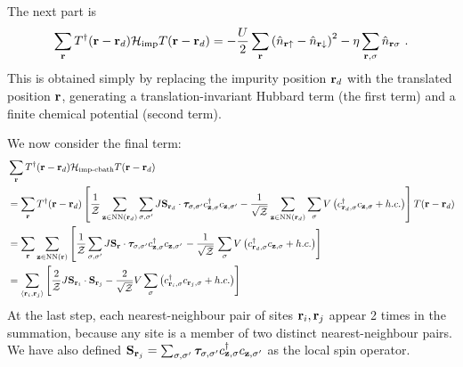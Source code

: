 \documentclass[reprint,hidelinks,onecolumn]{revtex4-2}
\begin{document}
The next part is
\begin{equation}\begin{aligned}
	\sum_{{\bf r}}T^\dagger({\bf r} - {\bf r}_d)\mathcal{H}_\text{imp}T({\bf r} - {\bf r}_d) = -\frac{U}{2}\sum_{{\bf r}}\left(\hat n_{{\bf r} \uparrow} - \hat n_{{\bf r} \downarrow} \right)^2 - \eta\sum_{{\bf r},\sigma} \hat n_{{\bf r}\sigma}~.
\end{aligned}\end{equation}
This is obtained simply by replacing the impurity position \({\bf r}_d\) with the translated position \({\bf r}\), generating a translation-invariant Hubbard term (the first term) and a finite chemical potential (second term).

We now consider the final term:
\begin{equation}\begin{aligned}
	&\sum_{{\bf r}}T^\dagger({\bf r} - {\bf r}_d)\mathcal{H}_\text{imp-cbath}T({\bf r} - {\bf r}_d)\\
	&=\sum_{{\bf r}}T^\dagger({\bf r} - {\bf r}_d)\left[\frac{1}{\mathcal{Z}}\sum_{{\bf z}\in\text{NN}({\bf r}_d)}\sum_{\sigma,\sigma^\prime}J {\bf S}_{{\bf r}_d}\cdot{\boldsymbol \tau}_{\sigma,\sigma^\prime}c^\dagger_{{\bf z},\sigma}c_{{\bf z},\sigma^\prime} - \frac{1}{\sqrt\mathcal{Z}}\sum_{{\bf z}\in\text{NN}({\bf r}_d)}\sum_{\sigma} V \left(c^\dagger_{{\bf r}_d,\sigma} c_{{{\bf z}},\sigma} + h.c.\right)\right]T({\bf r} - {\bf r}_d)\\
	&=\sum_{{\bf r}}\sum_{{\bf z}\in\text{NN}({\bf r})}\left[\frac{1}{\mathcal{Z}}\sum_{\sigma,\sigma^\prime}J {\bf S}_{{\bf r}}\cdot{\boldsymbol \tau}_{\sigma,\sigma^\prime}c^\dagger_{{\bf z},\sigma}c_{{\bf z},\sigma^\prime} \right. -  \frac{1}{\sqrt\mathcal{Z}}\left.\sum_{\sigma} V\left(c^\dagger_{{\bf r}_d,\sigma} c_{{{\bf z}},\sigma} + h.c.\right)\right]\\
					 &=\sum_{\left< {\bf r}_i, {\bf r}_j\right>}\left[\frac{2}{\mathcal{Z}}J {\bf S}_{{\bf r}_i}\cdot{\bf S}_{{\bf r}_j} - \frac{2}{\sqrt\mathcal{Z}}V \sum_{\sigma}\left(c^\dagger_{{\bf r}_i,\sigma} c_{{{\bf r}_j},\sigma} + h.c.\right)\right]\\
\end{aligned}\end{equation}
At the last step, each nearest-neighbour pair of sites \({\bf r}_i, {\bf r}_j\) appear 2 times in the summation, because any site is a member of two distinct nearest-neighbour pairs. We have also defined \({\bf S}_{{\bf r}_j} =\sum_{\sigma,\sigma^\prime} {\boldsymbol \tau}_{\sigma,\sigma^\prime}c^\dagger_{{\bf z},\sigma}c_{{\bf z},\sigma^\prime}\) as the local spin operator.
\end{document}
